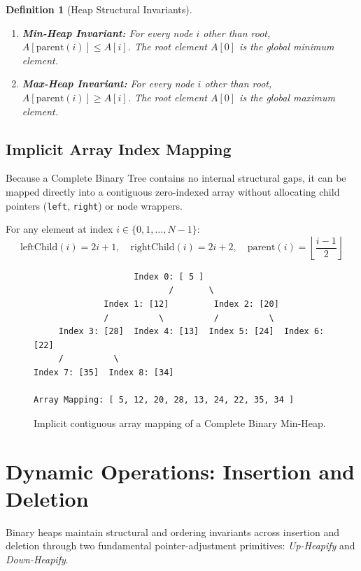 \documentclass[10pt,journal,compsoc,onecolumn]{IEEEtran}
\newtheorem{definition}[theorem]{Definition}
\begin{document}
\begin{definition}[Heap Structural Invariants]
\begin{enumerate}
    \item \textbf{Min-Heap Invariant:} For every node $i$ other than root, $A[\text{parent}(i)] \le A[i]$. The root element $A[0]$ is the global minimum element.
    \item \textbf{Max-Heap Invariant:} For every node $i$ other than root, $A[\text{parent}(i)] \ge A[i]$. The root element $A[0]$ is the global maximum element.
\end{enumerate}
\end{definition}

\subsection{Implicit Array Index Mapping}
Because a Complete Binary Tree contains no internal structural gaps, it can be mapped directly into a contiguous zero-indexed array without allocating child pointers (\texttt{left}, \texttt{right}) or node wrappers.

For any element at index $i \in \{0, 1, \dots, N-1\}$:
\[
\text{leftChild}(i) = 2i + 1, \quad \text{rightChild}(i) = 2i + 2, \quad \text{parent}(i) = \left\lfloor \frac{i - 1}{2} \right\rfloor
\]

\begin{figure}[htbp]
\centering
\begin{verbatim}
                    Index 0: [ 5 ]
                           /       \
              Index 1: [12]         Index 2: [20]
              /          \          /          \
     Index 3: [28]  Index 4: [13]  Index 5: [24]  Index 6: [22]
     /          \
Index 7: [35]  Index 8: [34]

Array Mapping: [ 5, 12, 20, 28, 13, 24, 22, 35, 34 ]
\end{verbatim}
\caption{Implicit contiguous array mapping of a Complete Binary Min-Heap.}
\label{fig:min-heap-tree}
\end{figure}

\section{Dynamic Operations: Insertion and Deletion}
\label{sec:heap-operations}

Binary heaps maintain structural and ordering invariants across insertion and deletion through two fundamental pointer-adjustment primitives: \emph{Up-Heapify} and \emph{Down-Heapify}.
\end{document}
